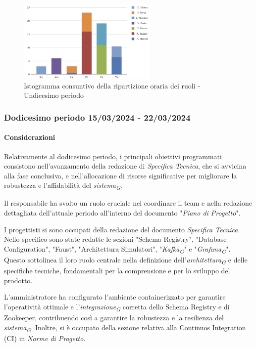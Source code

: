\begin{figure}[H]
    \centering
    \includegraphics[width=0.6\textwidth]{../Images/graficoConsPrev11.png}
    \caption{Istogramma consuntivo della ripartizione oraria dei ruoli - Undicesimo periodo}
    \label{fig:Consuntivo_ripartizione_oraria_11}
\end{figure}


\subsubsection{Dodicesimo periodo  15/03/2024 - 22/03/2024}

\paragraph{Considerazioni}
Relativamente al dodicesimo periodo, i principali obiettivi programmati consistono nell'avanzamento della redazione di \textit{Specifica Tecnica}, che si avvicina alla fase conclusiva, e nell'allocazione di risorse significative per migliorare la robustezza e l'affidabilità del \textit{sistema}\textsubscript{\textit{G}}.

Il responsabile ha svolto un ruolo cruciale nel coordinare il team e nella redazione dettagliata dell'attuale periodo all'interno del documento "\textit{Piano di Progetto}".

I progettisti si sono occupati della redazione del documento \textit{Specifica Tecnica}. Nello specifico sono state redatte le sezioni "Schema Registry", "Database Configuration", "Faust", "Architettura Simulatori", "\textit{Kafka}\textsubscript{\textit{G}}" e "\textit{Grafana}\textsubscript{\textit{G}}". Questo sottolinea il loro ruolo centrale nella definizione dell'\textit{architettura}\textsubscript{\textit{G}} e delle specifiche tecniche, fondamentali per la comprensione e per lo sviluppo del prodotto.

L'amministratore ha configurato l'ambiente containerizzato per garantire l'operatività ottimale e l'\textit{integrazione}\textsubscript{\textit{G}} corretta dello Schema Registry e di Zookeeper, contribuendo così a garantire la robustezza e la resilienza del \textit{sistema}\textsubscript{\textit{G}}. Inoltre, si è occupato della sezione relativa alla Continuos Integration (CI) in \textit{Norme di Progetto}.

